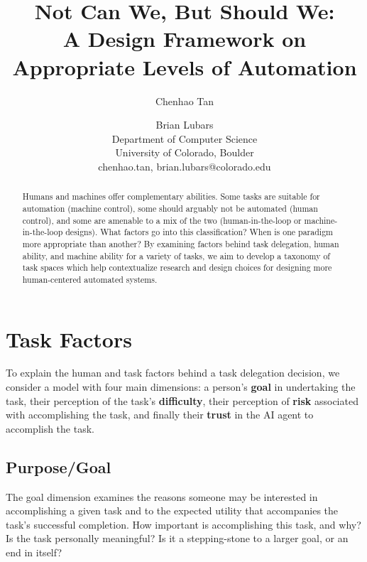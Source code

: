 \documentclass[letterpaper]{article} %
\begin{document}
%
\title{Not Can We, But Should We: \\A Design Framework on Appropriate Levels of Automation}

\author{Chenhao Tan \and Brian Lubars\\
Department of Computer Science\\
University of Colorado, Boulder\\
{chenhao.tan, brian.lubars}@colorado.edu\\
}


\maketitle
\begin{abstract}
Humans and machines offer complementary abilities. Some tasks are suitable for automation (machine control), some should arguably not be automated (human control), and some are amenable to a mix of the two (human-in-the-loop or machine-in-the-loop designs). What factors go into this classification? When is one paradigm more appropriate than another? By examining factors behind task delegation, human ability, and machine ability for a variety of tasks, we aim to develop a taxonomy of task spaces which help contextualize research and design choices for designing more human-centered automated systems.
\end{abstract}

\section{Task Factors}
To explain the human and task factors behind a task delegation decision, we consider a model with four main dimensions: a person's \textbf{goal} in undertaking the task, their perception of the task's \textbf{difficulty}, their perception of \textbf{risk} associated with accomplishing the task, and finally their \textbf{trust} in the AI agent to accomplish the task.

\subsection{Purpose/Goal}
The goal dimension examines the reasons someone may be interested in accomplishing a given task and to the expected utility that accompanies the task's successful completion. How important is accomplishing this task, and why? Is the task personally meaningful? Is it a stepping-stone to a larger goal, or an end in itself? 
\end{document}

